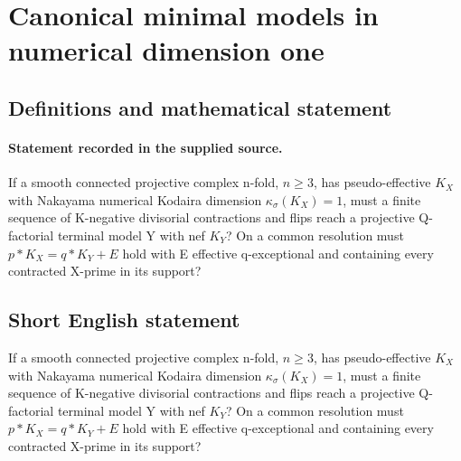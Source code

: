 \documentclass[11pt]{article}
\begin{document}
\section*{Canonical minimal models in numerical dimension one}\label{statement}
\subsection{Definitions and mathematical statement}
\paragraph{Statement recorded in the supplied source.}
If a smooth connected projective complex n-fold, $n\geq 3$, has pseudo-effective $K_X$ with Nakayama numerical Kodaira dimension $\kappa _\sigma (K_X)=1$, must a finite sequence of K-negative divisorial contractions and flips reach a projective Q-factorial terminal model Y with nef $K_Y$? On a common resolution must $p*K_X=q*K_Y+E$ hold with E effective q-exceptional and containing every contracted X-prime in its support?
\subsection{Short English statement}
If a smooth connected projective complex n-fold, $n\geq 3$, has pseudo-effective $K_X$ with Nakayama numerical Kodaira dimension $\kappa _\sigma (K_X)=1$, must a finite sequence of K-negative divisorial contractions and flips reach a projective Q-factorial terminal model Y with nef $K_Y$? On a common resolution must $p*K_X=q*K_Y+E$ hold with E effective q-exceptional and containing every contracted X-prime in its support?
\end{document}
